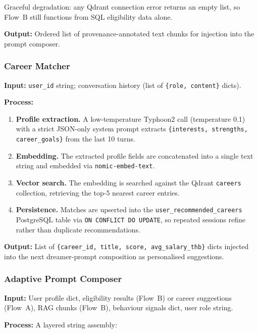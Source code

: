 ﻿\documentclass[12pt,a4paper]{article}
\begin{document}
Graceful degradation: any Qdrant connection error returns an empty list, so
Flow~B still functions from SQL eligibility data alone.

\textbf{Output:} Ordered list of provenance-annotated text chunks for injection
into the prompt composer.

\subsubsection{Career Matcher}

\textbf{Input:} \texttt{user\_id} string; conversation history (list of
\texttt{\{role, content\}} dicts).

\textbf{Process:}

\begin{enumerate}
    \item \textbf{Profile extraction.} A low-temperature Typhoon2 call (temperature
    0.1) with a strict JSON-only system prompt extracts
    \texttt{\{interests, strengths, career\_goals\}} from the last 10 turns.
    \item \textbf{Embedding.} The extracted profile fields are concatenated into a
    single text string and embedded via \texttt{nomic-embed-text}.
    \item \textbf{Vector search.} The embedding is searched against the Qdrant
    \texttt{careers} collection, retrieving the top-5 nearest career entries.
    \item \textbf{Persistence.} Matches are upserted into the
    \texttt{user\_recommended\_careers} PostgreSQL table via \texttt{ON CONFLICT DO
    UPDATE}, so repeated sessions refine rather than duplicate recommendations.
\end{enumerate}

\textbf{Output:} List of \texttt{\{career\_id, title, score, avg\_salary\_thb\}}
dicts injected into the next dreamer-prompt composition as personalised suggestions.

\subsubsection{Adaptive Prompt Composer}

\textbf{Input:} User profile dict, eligibility results (Flow~B) or career
suggestions (Flow~A), RAG chunks (Flow~B), behaviour signals dict, user role string.

\textbf{Process:} A layered string assembly:
\end{document}
